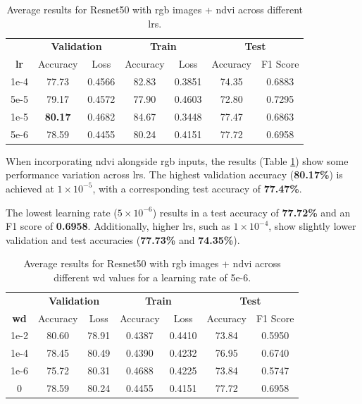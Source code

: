 \begin{table}[h]
    \centering
    \renewcommand{\arraystretch}{1.3}
    \setlength{\tabcolsep}{8pt}
    \begin{tabular}{|c|cccccc|}
        \hline
        & \multicolumn{2}{c}{\textbf{Validation}} & \multicolumn{2}{c}{\textbf{Train}} & \multicolumn{2}{c|}{\textbf{Test}} \\
        \textbf{\gls{lr}} & Accuracy & Loss & Accuracy & Loss & Accuracy & F1 Score \\
        \hline
        1e-4 & 77.73 & 0.4566 & 82.83 & 0.3851 & 74.35 & 0.6883 \\
        5e-5 & 79.17 & 0.4572 & 77.90 & 0.4603 & 72.80 & 0.7295 \\
        1e-5 & \textbf{80.17} & 0.4682 & 84.67 & 0.3448 & 77.47 & 0.6863 \\
        5e-6 & 78.59 & 0.4455 & 80.24 & 0.4151 & 77.72 & 0.6958 \\
        \hline
    \end{tabular}
    \caption{Average results for Resnet50 with \gls{rgb} images + \gls{ndvi} across different \glspl{lr}.}
    \label{tab:resnet50_rgb_ndvi}
\end{table}

When incorporating \gls{ndvi} alongside \gls{rgb} inputs, the results (Table \ref{tab:resnet50_rgb_ndvi}) 
show some performance variation across \glspl{lr}. The highest validation accuracy 
(\textbf{80.17\%}) is achieved at $1\times10^{-5}$, with a corresponding test accuracy of 
\textbf{77.47\%}.

The lowest learning rate ($5\times10^{-6}$) results in a test accuracy of \textbf{77.72\%} 
and an F1 score of \textbf{0.6958}. Additionally, higher \glspl{lr}, such as $1\times10^{-4}$, 
show slightly lower validation and test accuracies (\textbf{77.73\%} and \textbf{74.35\%}).

\begin{table}[h]
    \centering
    \renewcommand{\arraystretch}{1.3}
    \setlength{\tabcolsep}{8pt}
    \begin{tabular}{|c|cccccc|}
        \hline
        & \multicolumn{2}{c}{\textbf{Validation}} & \multicolumn{2}{c}{\textbf{Train}} & \multicolumn{2}{c|}{\textbf{Test}} \\
        \textbf{\gls{wd}} & Accuracy & Loss & Accuracy & Loss & Accuracy & F1 Score \\
        \hline
        1e-2 & 80.60 & 78.91 & 0.4387 & 0.4410 & 73.84 & 0.5950 \\
        1e-4 & 78.45 & 80.49 & 0.4390 & 0.4232 & 76.95 & 0.6740 \\
        1e-6 & 75.72 & 80.31 & 0.4688 & 0.4225 & 73.84 & 0.5747 \\
        0    & 78.59 & 80.24 & 0.4455 & 0.4151 & 77.72 & 0.6958 \\
        \hline
    \end{tabular}
    \caption{Average results for Resnet50 with \gls{rgb} images + \gls{ndvi} across different \gls{wd} values for a learning rate of 5e-6.}
    \label{tab:resnet50_wd_rgb_ndvi}
\end{table}

